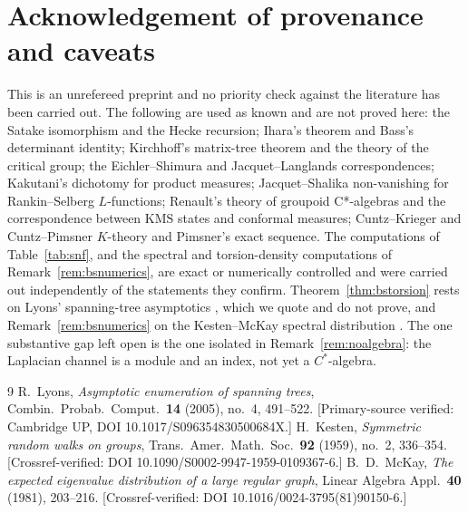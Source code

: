 \documentclass[11pt]{amsart}
\numberwithin{equation}{section}
\theoremstyle{definition}
\theoremstyle{remark}
\newcommand{\KMS}{\mathrm{KMS}}
\begin{document}
\section*{Acknowledgement of provenance and caveats}

This is an unrefereed preprint and no priority check against the literature has been
carried out. The following are used as known and are not proved here: the Satake
isomorphism and the Hecke recursion; Ihara's theorem and Bass's determinant identity;
Kirchhoff's matrix-tree theorem and the theory of the critical group; the
Eichler--Shimura and Jacquet--Langlands correspondences; Kakutani's dichotomy for product
measures; Jacquet--Shalika non-vanishing for Rankin--Selberg $L$-functions; Renault's
theory of groupoid C*-algebras and the correspondence between $\KMS$ states and conformal
measures; Cuntz--Krieger and Cuntz--Pimsner $K$-theory and Pimsner's exact sequence. The
computations of Table~\ref{tab:snf}, and the spectral and torsion-density computations of
Remark~\ref{rem:bsnumerics}, are exact or numerically controlled and were carried out
independently of the statements they confirm. Theorem~\ref{thm:bstorsion} rests on
Lyons' spanning-tree asymptotics \cite{Lyons2005}, which we quote and do not prove, and
Remark~\ref{rem:bsnumerics} on the Kesten--McKay spectral distribution
\cite{Kesten1959,McKay1981}. The one substantive gap left open is the one isolated in
Remark~\ref{rem:noalgebra}: the Laplacian channel is a module and an index, not yet a
$C^*$-algebra.

\begin{thebibliography}{9}
 R.~Lyons, \emph{Asymptotic enumeration of spanning trees},
Combin.\ Probab.\ Comput.\ \textbf{14} (2005), no.~4, 491--522. [Primary-source
verified: Cambridge UP, DOI 10.1017/S096354830500684X.]
 H.~Kesten, \emph{Symmetric random walks on groups},
Trans.\ Amer.\ Math.\ Soc.\ \textbf{92} (1959), no.~2, 336--354. [Crossref-verified:
DOI 10.1090/S0002-9947-1959-0109367-6.]
 B.~D.~McKay, \emph{The expected eigenvalue distribution of a large
regular graph}, Linear Algebra Appl.\ \textbf{40} (1981), 203--216.
[Crossref-verified: DOI 10.1016/0024-3795(81)90150-6.]
\end{thebibliography}
\end{document}
